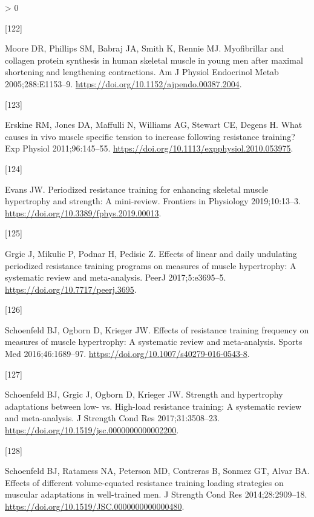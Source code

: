 \documentclass[twoside,10pt]{gihclass} %
\newlength{\cslhangindent}
\newlength{\csllabelwidth}
\newenvironment{CSLReferences}[3] %
 {%
  \setlength{\parindent}{0pt}
  \ifodd #1 \everypar{\setlength{\hangindent}{\cslhangindent}}\ignorespaces\fi
  \ifnum #2 > 0
  \setlength{\parskip}{#2\baselineskip}
  \fi
 }%
 {}
\newcommand{\CSLLeftMargin}[1]{\parbox[t]{\maxof{\widthof{#1}}{\csllabelwidth}}{#1}}
\newcommand{\CSLRightInline}[1]{\parbox[t]{\linewidth}{#1}}
\begin{document}
\begin{CSLReferences}{0}{0}
\leavevmode\hypertarget{ref-RN2457}{}%
\CSLLeftMargin{{[}122{]} }
\CSLRightInline{Moore DR, Phillips SM, Babraj JA, Smith K, Rennie MJ. Myofibrillar and collagen protein synthesis in human skeletal muscle in young men after maximal shortening and lengthening contractions. Am J Physiol Endocrinol Metab 2005;288:E1153--9. \url{https://doi.org/10.1152/ajpendo.00387.2004}.}

\leavevmode\hypertarget{ref-RN1504}{}%
\CSLLeftMargin{{[}123{]} }
\CSLRightInline{Erskine RM, Jones DA, Maffulli N, Williams AG, Stewart CE, Degens H. What causes in vivo muscle specific tension to increase following resistance training? Exp Physiol 2011;96:145--55. \url{https://doi.org/10.1113/expphysiol.2010.053975}.}

\leavevmode\hypertarget{ref-RN2575}{}%
\CSLLeftMargin{{[}124{]} }
\CSLRightInline{Evans JW. Periodized resistance training for enhancing skeletal muscle hypertrophy and strength: A mini-review. Frontiers in Physiology 2019;10:13--3. \url{https://doi.org/10.3389/fphys.2019.00013}.}

\leavevmode\hypertarget{ref-RN2572}{}%
\CSLLeftMargin{{[}125{]} }
\CSLRightInline{Grgic J, Mikulic P, Podnar H, Pedisic Z. Effects of linear and daily undulating periodized resistance training programs on measures of muscle hypertrophy: A systematic review and meta-analysis. PeerJ 2017;5:e3695--5. \url{https://doi.org/10.7717/peerj.3695}.}

\leavevmode\hypertarget{ref-RN2571}{}%
\CSLLeftMargin{{[}126{]} }
\CSLRightInline{Schoenfeld BJ, Ogborn D, Krieger JW. Effects of resistance training frequency on measures of muscle hypertrophy: A systematic review and meta-analysis. Sports Med 2016;46:1689--97. \url{https://doi.org/10.1007/s40279-016-0543-8}.}

\leavevmode\hypertarget{ref-RN2569}{}%
\CSLLeftMargin{{[}127{]} }
\CSLRightInline{Schoenfeld BJ, Grgic J, Ogborn D, Krieger JW. Strength and hypertrophy adaptations between low- vs. High-load resistance training: A systematic review and meta-analysis. J Strength Cond Res 2017;31:3508--23. \url{https://doi.org/10.1519/jsc.0000000000002200}.}

\leavevmode\hypertarget{ref-RN1612}{}%
\CSLLeftMargin{{[}128{]} }
\CSLRightInline{Schoenfeld BJ, Ratamess NA, Peterson MD, Contreras B, Sonmez GT, Alvar BA. Effects of different volume-equated resistance training loading strategies on muscular adaptations in well-trained men. J Strength Cond Res 2014;28:2909--18. \url{https://doi.org/10.1519/JSC.0000000000000480}.}


\end{CSLReferences}
\end{document}
